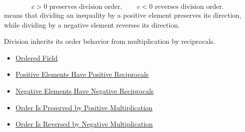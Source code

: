 \begin{remark*}
\[
c>0\text{ preserves division order},
\qquad
c<0\text{ reverses division order}.
\]
means that dividing an inequality by a positive element preserves its direction,
while dividing by a negative element reverses its direction.
\end{remark*}

\begin{remark*}[Interpretation]
Division inherits its order behavior from multiplication by reciprocals.
\end{remark*}

\begin{dependencies}
\begin{itemize}
  \item \hyperref[def:ordered-field]{Ordered Field}
  \item \hyperref[thm:ordered-field-positive-reciprocals]{Positive Elements Have Positive Reciprocals}
  \item \hyperref[thm:ordered-field-negative-reciprocals]{Negative Elements Have Negative Reciprocals}
  \item \hyperref[thm:ordered-field-positive-multiplication-preserves-order]{Order Is Preserved by Positive Multiplication}
  \item \hyperref[thm:ordered-field-negative-multiplication-reverses-order]{Order Is Reversed by Negative Multiplication}
\end{itemize}
\end{dependencies}
